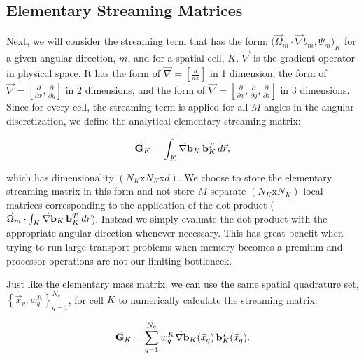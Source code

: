 \subsection{Elementary Streaming Matrices}
\label{sec::Sn_Spatial_Streaming}

Next, we will consider the streaming term that has the form: $ \Big( \vec{\Omega}_m \cdot \vec{\nabla}  b_m , \Psi_m  \Big)_K$ for a given angular direction, $m$, and for a spatial cell, $K$. $\vec{\nabla} $ is the gradient operator in physical space. It has the form of $\vec{\nabla} = \left[ \frac{d}{dx} \right]$ in 1 dimension, the form of $\vec{\nabla} = \left[ \frac{\partial}{\partial x} , \frac{\partial}{\partial y} \right]$ in 2 dimensions, and the form of $\vec{\nabla} = \left[ \frac{\partial}{\partial x} , \frac{\partial}{\partial y} , \frac{\partial}{\partial z} \right]$ in 3 dimensions. Since for every cell, the streaming term is applied for all $M$ angles in the angular discretization, we define the analytical elementary streaming matrix:

\begin{equation}
\label{eq::Sn_streaming_matrix_analytical}
\vec{{\bf G}}_K =    \int_K \vec{\nabla} {\bf b}_K \, {\bf b}_K^T \, d {\vec{r}} ,
\end{equation}

\noindent which has dimensionality $(N_K \text{x} N_K \text{x} d)$. We choose to store the elementary streaming matrix in this form and not store $M$ separate $(N_K \text{x} N_K)$ local matrices corresponding to the application of the dot product ($ \vec{\Omega}_m  \cdot \int_K  \vec{\nabla} {\bf b}_K \, {\bf b}_K^T \, d {\vec{r}}$). Instead we simply evaluate the dot product with the appropriate angular direction whenever necessary. This has great benefit when trying to run large transport problems when memory becomes a premium and processor operations are not our limiting bottleneck. 

Just like the elementary mass matrix, we can use the same spatial quadrature set, $\left\{  \vec{x}_q , w_q^{K}  \right\}_{q=1}^{N_q}$, for cell $K$ to numerically calculate the streaming matrix:

\begin{equation}
\label{eq::Sn_streaming_matrix_numerical}
\vec{{\bf G}}_K =    \sum_{q = 1}^{N_q} w_{q}^K \vec{\nabla} {\bf b}_K (\vec{x}_q) \, {\bf b}_K^T (\vec{x}_q) .
\end{equation}

